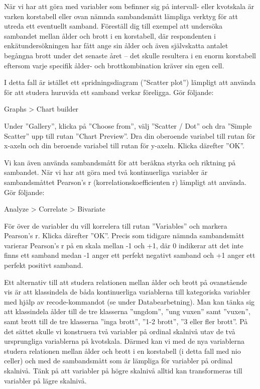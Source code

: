 \documentclass[
]{book}
\begin{document}
När vi har att göra med variabler som befinner sig på intervall- eller kvotskala är varken korstabell eller
ovan nämnda sambandsmått lämpliga verktyg för att utreda ett eventuellt samband. Föreställ dig till
exempel att undersöka sambandet mellan ålder och brott i en korstabell, där respondenten i
enkätundersökningen har fått ange sin ålder och även självskatta antalet begångna brott under det
senaste året -- det skulle resultera i en enorm korstabell eftersom varje specifik ålder- och
brottkombination kräver sin egen cell.

I detta fall är istället ett spridningsdiagram (''Scatter plot'') lämpligt att använda för att studera huruvida
ett samband verkar föreligga. Gör följande:

Graphs \textgreater{} Chart builder

Under ''Gallery'', klicka på ''Choose from'', välj ''Scatter / Dot'' och dra ''Simple Scatter'' upp till rutan
''Chart Preview''. Dra din oberoende variabel till rutan för x-axeln och din beroende variabel till rutan för
y-axeln. Klicka därefter ''OK''.

Vi kan även använda sambandsmått för att beräkna styrka och riktning på sambandet. När vi har att
göra med två kontinuerliga variabler är sambandsmåttet Pearson's r (korrelationskoefficienten r)
lämpligt att använda. Gör följande:

Analyze \textgreater{} Correlate \textgreater{} Bivariate

För över de variabler du vill korrelera till rutan ''Variables'' och markera Pearson's r. Klicka därefter
''OK''. Precis som tidigare nämnda sambandsmått varierar Pearson's r på en skala mellan -1 och +1, där
0 indikerar att det inte finns ett samband medan -1 anger ett perfekt negativt samband och +1 anger ett
perfekt positivt samband.

Ett alternativ till att studera relationen mellan ålder och brott på ovanstående vis är att klassindela de
båda kontinuerliga variablerna till kategoriska variabler med hjälp av recode-kommandot (se under
Databearbetning). Man kan tänka sig att klassindela ålder till de tre klasserna ''ungdom'', ''ung vuxen''
samt ''vuxen'', samt brott till de tre klasserna ''inga brott'', ''1-2 brott'', ''3 eller fler brott''. På det sättet
skulle vi konstruera två variabler på ordinal skalnivå utav de två ursprungliga variablerna på kvotskala.
Därmed kan vi med de nya variablerna studera relationen mellan ålder och brott i en korstabell (i detta
fall med nio celler) och med de sambandsmått som är lämpliga för variabler på ordinal skalnivå. Tänk på
att variabler på högre skalnivå alltid kan transformeras till variabler på lägre skalnivå.
\end{document}

